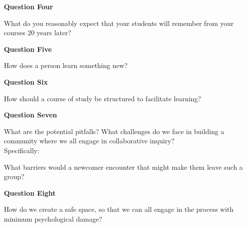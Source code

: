 \documentclass[10pt,handout]{beamer}
\begin{document}
\begin{frame}{\textbf{Question Four}}

\begin{center}{\Huge What do you reasonably expect that your students will remember from your courses 20 years later?}\end{center}

\end{frame}

\begin{frame}{\textbf{Question Five}}

\begin{center}{\Huge How does a person learn something new?}\end{center}

\end{frame}

\begin{frame}{\textbf{Question Six}}

\begin{center}{\Huge How should a course of study be structured to facilitate learning?}\end{center}

\end{frame}

\begin{frame}{\textbf{Question Seven}}

{\Large
What are the potential pitfalls? What challenges do we face in building a community where we all engage in collaborative inquiry?}\\[.5in]

Specifically:
\begin{center}{\huge What barriers would a newcomer encounter that might make them leave such a group?}\end{center}

\end{frame}

\begin{frame}{\textbf{Question Eight}}

\begin{center}{\Huge How do we create a safe space, so that we can all engage in the process with minimum psychological damage?}\end{center}

\end{frame}

\end{document}
